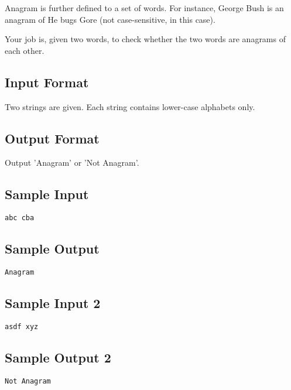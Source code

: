 Anagram is further defined to a set of words. For instance, George Bush is an anagram of He bugs Gore (not case-sensitive, in this case). 

Your job is, given two words, to check whether the two words are anagrams of each other. 


\subsection*{Input Format}
Two strings are given.  Each string contains lower-case alphabets only.

\subsection*{Output Format}
Output 'Anagram' or 'Not Anagram'. 

\subsection*{Sample Input}
\begin{verbatim}
abc cba
\end{verbatim}

\subsection*{Sample Output}
\begin{verbatim}
Anagram
\end{verbatim}

\subsection*{Sample Input 2}
\begin{verbatim}
asdf xyz
\end{verbatim}

\subsection*{Sample Output 2}
\begin{verbatim}
Not Anagram
\end{verbatim}

\newpage




